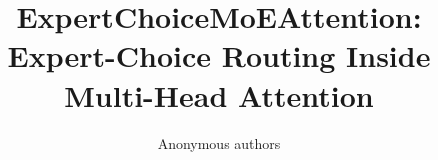\title{\textbf{ExpertChoiceMoEAttention: Expert-Choice Routing Inside Multi-Head Attention}}

\author{Anonymous authors}
